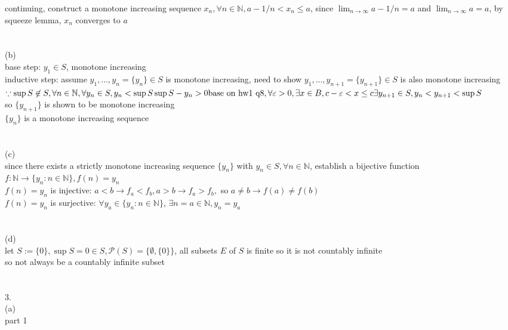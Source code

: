 \documentclass[12pt, border = 4pt, multi]{article} %
\begin{document}
continuing, construct a monotone increasing sequence $x_n, \forall n \in \mathbb{N}, a - 1 / n < x_n \leq a$, since $\lim_{n \rightarrow \infty} a - 1 / n = a$ and $\lim_{n \rightarrow \infty} a = a$, by squeeze lemma, $x_n$ converges to $a$\\
\\
\\
(b)\\
base step: $y_1 \in S$, monotone increasing\\
inductive step: assume $y_1, ..., y_n = \{y_n\} \in S$ is monotone increasing, need to show $y_1, ..., y_{n + 1} = \{y_{n + 1}\} \in S$ is also monotone increasing\\
$\because \sup S \not\in S, \forall n \in \mathbb{N}, \forall y_n \in S, y_n < \sup S \\
\sup S - y_n > 0\\
\text{base on hw1 q8}, \forall \varepsilon > 0, \exists x \in B, c - \varepsilon < x \leq c\\
\exists y_{n + 1} \in S, y_n < y_{n + 1} < \sup S$\\
so $\{y_{n + 1}\}$ is shown to be monotone increasing\\
$\{y_n\}$ is a monotone increasing sequence\\
\\
\\
(c)\\
since there exists a strictly monotone increasing sequence $\{y_n\}$ with $y_n \in S, \forall n \in \mathbb{N}$, establish a bijective function $f: \mathbb{N} \rightarrow \{y_n : n \in \mathbb{N}\}, f(n) = y_n$\\
$f(n) = y_n$ is injective: $a < b \rightarrow f_a < f_b, a > b \rightarrow f_a > f_b,$ so $a \not= b \rightarrow f(a) \not= f(b)$\\
$f(n) = y_n$ is surjective: $\forall y_a \in \{y_n: n \in \mathbb{N}\}$, $\exists n = a \in \mathbb{N}, y_n = y_a$\\
\\
\\
(d)\\
let $S := \{0\}, \sup S = 0 \in S, \mathcal{P}(S) = \{\emptyset, \{0\}\}$, all subsets $E$ of $S$ is finite so it is not countably infinite\\
so not always be a countably infinite subset\\
\\
\\
3.\\
(a)\\
part 1\\
\end{document}
